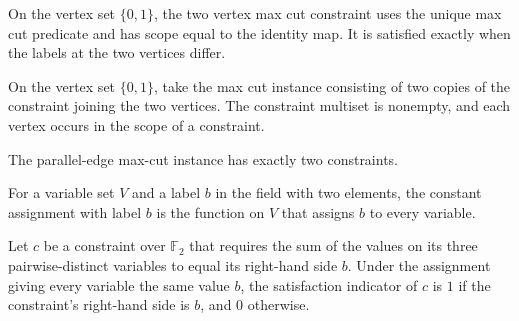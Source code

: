 \begin{definition}
\label{FABL.twoVertexMaxCutConstraint}
\leanok
{}
On the vertex set $\{0,1\}$, the two vertex max cut constraint uses the unique max cut
predicate and has scope equal to the identity map. It is satisfied exactly when the
labels at the two vertices differ.
\end{definition}

\begin{definition}
\label{FABL.parallelEdgeMaxCutInstance}
\leanok
{}
On the vertex set $\{0,1\}$, take the max cut instance consisting of two copies of the
constraint joining the two vertices. The constraint multiset is nonempty, and each
vertex occurs in the scope of a constraint.
\end{definition}

\begin{theorem}
\label{FABL.parallelEdgeMaxCutInstance_card}
\leanok
{}
The parallel-edge max-cut instance has exactly two constraints.
\end{theorem}

\begin{definition}
\label{FABL.e3LinConstantAssignment}
\leanok
{}
For a variable set $V$ and a label $b$ in the field with two elements, the constant
assignment with label $b$ is the function on $V$ that assigns $b$ to every variable.
\end{definition}

\begin{theorem}
\label{FABL.satisfiedIndicator_e3LinConstantAssignment}
\leanok
{}
Let $c$ be a constraint over $\mathbb{F}_2$ that requires the sum of the values on its
three pairwise-distinct variables to equal its right-hand side $b$. Under the assignment
giving every variable the same value $b$, the satisfaction indicator of $c$ is $1$ if
the constraint's right-hand side is $b$, and $0$ otherwise.
\end{theorem}

